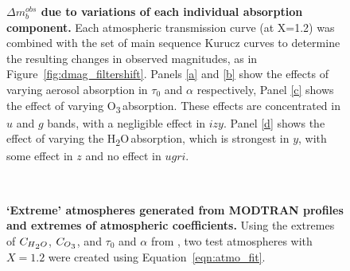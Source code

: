 \documentclass[12pt,preprint]{aastex}
\newcommand{\water}   {H\textsubscript{2}O}
\newcommand{\ozone}    {O\textsubscript{3}}
\begin{document}
\begin{figure}
\caption{{\small
{\bf $\Delta m_b^{obs}$ due to variations of each
individual absorption component.} Each atmospheric transmission curve
(at X=1.2) was combined with the set of main sequence Kurucz curves to
determine the resulting changes in observed magnitudes, as in
Figure~\ref{fig:dmag_filtershift}. Panels \ref{a} and \ref{b} show the
effects of varying aerosol absorption in $\tau_0$ and $\alpha$
respectively, Panel \ref{c} shows the effect of varying \ozone\,absorption. These
effects are concentrated in $u$ and $g$ bands, with a negligible effect
in $izy$. Panel \ref{d} shows the effect of varying the \water\,absorption,
which is strongest in $y$, with some effect in $z$ and no effect in
$ugri$.
}}
\label{fig:dmag_atm_comps}
\end{figure}

\begin{figure}
\centering
{} \\
\caption{{\small  {\bf `Extreme' atmospheres generated from MODTRAN profiles and extremes 
of atmospheric coefficients.} Using the extremes of $C_{\water}$, $C_{\ozone}$,
and $\tau_0$ and $\alpha$ from \citet{Burke2010b}, two test atmospheres
with $X=1.2$ were created using Equation~\ref{eqn:atmo_fit}. }}
\label{fig:atm_changes}
\end{figure}
\end{document}
